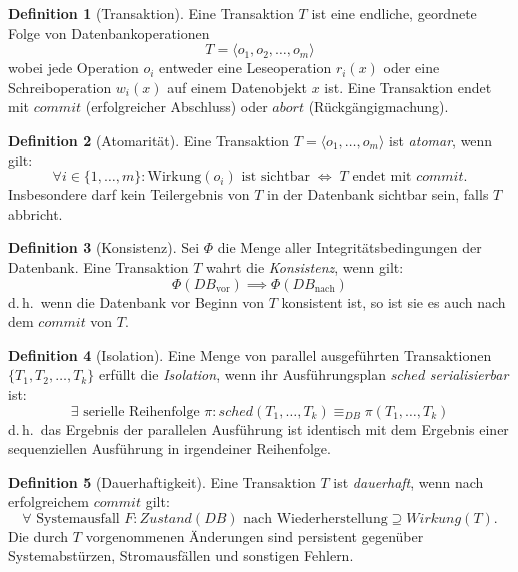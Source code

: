 ﻿\documentclass[a4paper,12pt]{article}
\theoremstyle{definition}
\newtheorem{definition}{Definition}
\begin{document}
\begin{definition}[Transaktion]
\label{def:transaktion}
Eine Transaktion $T$ ist eine endliche, geordnete Folge von Datenbankoperationen
\[
T = \langle o_1, o_2, \ldots, o_m \rangle
\]
wobei jede Operation $o_i$ entweder eine Leseoperation $r_i(x)$ oder eine Schreiboperation $w_i(x)$ auf einem Datenobjekt $x$ ist. Eine Transaktion endet mit $\mathit{commit}$ (erfolgreicher Abschluss) oder $\mathit{abort}$ (Rückgängigmachung).
\end{definition}

\begin{definition}[Atomarität]
\label{def:atomaritaet}
Eine Transaktion $T = \langle o_1, \ldots, o_m \rangle$ ist \emph{atomar}, wenn gilt:
\[
\forall i \in \{1, \ldots, m\}: \text{Wirkung}(o_i) \text{ ist sichtbar} \;\Leftrightarrow\; T \text{ endet mit } \mathit{commit}.
\]
Insbesondere darf kein Teilergebnis von $T$ in der Datenbank sichtbar sein, falls $T$ abbricht.
\end{definition}

\begin{definition}[Konsistenz]
\label{def:konsistenz}
Sei $\Phi$ die Menge aller Integritätsbedingungen der Datenbank. Eine Transaktion $T$ wahrt die \emph{Konsistenz}, wenn gilt:
\[
\Phi(\mathit{DB}_{\text{vor}}) \implies \Phi(\mathit{DB}_{\text{nach}})
\]
d.\,h.\ wenn die Datenbank vor Beginn von $T$ konsistent ist, so ist sie es auch nach dem $\mathit{commit}$ von $T$.
\end{definition}

\begin{definition}[Isolation]
\label{def:isolation}
Eine Menge von parallel ausgeführten Transaktionen $\{T_1, T_2, \ldots, T_k\}$ erfüllt die \emph{Isolation}, wenn ihr Ausführungsplan $\mathit{sched}$ \emph{serialisierbar} ist:
\[
\exists \text{ serielle Reihenfolge } \pi: \mathit{sched}(T_1, \ldots, T_k) \equiv_{\mathit{DB}} \pi(T_1, \ldots, T_k)
\]
d.\,h.\ das Ergebnis der parallelen Ausführung ist identisch mit dem Ergebnis einer sequenziellen Ausführung in irgendeiner Reihenfolge.
\end{definition}

\begin{definition}[Dauerhaftigkeit]
\label{def:dauerhaftigkeit}
Eine Transaktion $T$ ist \emph{dauerhaft}, wenn nach erfolgreichem $\mathit{commit}$ gilt:
\[
\forall \text{ Systemausfall } F: \mathit{Zustand}(\mathit{DB}) \text{ nach Wiederherstellung} \supseteq \mathit{Wirkung}(T).
\]
Die durch $T$ vorgenommenen Änderungen sind persistent gegenüber Systemabstürzen, Stromausfällen und sonstigen Fehlern.
\end{definition}
\end{document}
